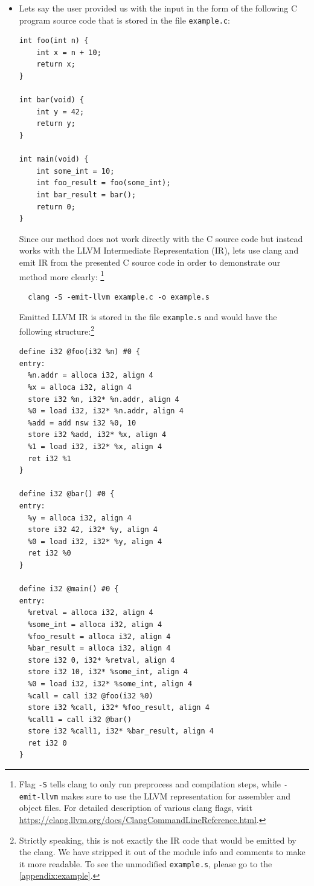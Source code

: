 \documentclass[12pt, twoside]{fithesis2}
\renewcommand{\_}{\leavevmode \kern0.07em\vbox{\hrule width0.4em}}
\newcommand{\squarebullet}{\textcolor{black}{\raisebox{0.15em}{\rule{4pt}{4pt}}}}
\newenvironment{myItemize}{
  \begin{itemize}[
    leftmargin=2em,
    rightmargin=1em,
    itemsep=\parskip,
    parsep=0em,
    topsep=0em,
    partopsep=0em
]
  \renewcommand{\labelitemi}{\squarebullet}
  \renewcommand{\labelitemii}{\textbullet}
}{
  \end{itemize}
}
\begin{document}
\begin{myItemize}
\item Lets say the user provided us with the input in the form of the following
C program source code that is stored in the file \texttt{example.c}:

\begin{verbatim}
int foo(int n) {
    int x = n + 10;
    return x;
}

int bar(void) {
    int y = 42;
    return y;
}

int main(void) {
    int some_int = 10;
    int foo_result = foo(some_int);
    int bar_result = bar();
    return 0;
}
\end{verbatim}

Since our method does not work directly with the C source code but instead
works with the LLVM Intermediate Representation (IR), lets use clang and emit
IR from the presented C source code in order to demonstrate our method more
clearly:
\footnote {
Flag \texttt{-S} tells clang to only run preprocess and
compilation steps, while \texttt{-emit-llvm} makes sure to use the LLVM
representation for assembler and object files. For detailed description of
various clang flags, visit
\url{https://clang.llvm.org/docs/ClangCommandLineReference.html}.
}

\begin{verbatim}
  clang -S -emit-llvm example.c -o example.s
\end{verbatim}

Emitted LLVM IR is stored in the file \texttt{example.s} and would
have the following structure:\footnote{
Strictly speaking, this is not exactly the IR code that would be emitted by the
clang. We have stripped it out of the module info and comments to make it more
readable. To see the unmodified \texttt{example.s}, please go to the
\autoref{appendix:example}.
}

\begin{verbatim}
define i32 @foo(i32 %n) #0 {
entry:
  %n.addr = alloca i32, align 4
  %x = alloca i32, align 4
  store i32 %n, i32* %n.addr, align 4
  %0 = load i32, i32* %n.addr, align 4
  %add = add nsw i32 %0, 10
  store i32 %add, i32* %x, align 4
  %1 = load i32, i32* %x, align 4
  ret i32 %1
}

define i32 @bar() #0 {
entry:
  %y = alloca i32, align 4
  store i32 42, i32* %y, align 4
  %0 = load i32, i32* %y, align 4
  ret i32 %0
}

define i32 @main() #0 {
entry:
  %retval = alloca i32, align 4
  %some_int = alloca i32, align 4
  %foo_result = alloca i32, align 4
  %bar_result = alloca i32, align 4
  store i32 0, i32* %retval, align 4
  store i32 10, i32* %some_int, align 4
  %0 = load i32, i32* %some_int, align 4
  %call = call i32 @foo(i32 %0)
  store i32 %call, i32* %foo_result, align 4
  %call1 = call i32 @bar()
  store i32 %call1, i32* %bar_result, align 4
  ret i32 0
}
\end{verbatim}
\end{myItemize}
\end{document}
